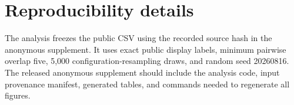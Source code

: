 \documentclass{article}
\begin{document}
\section{Reproducibility details}
The analysis freezes the public CSV using the recorded source hash in the
anonymous supplement. It uses exact public display labels, minimum pairwise overlap five, 5,000
configuration-resampling draws, and random seed 20260816. The released anonymous
supplement should include the analysis code, input provenance manifest, generated
tables, and commands needed to regenerate all figures.


\end{document}
